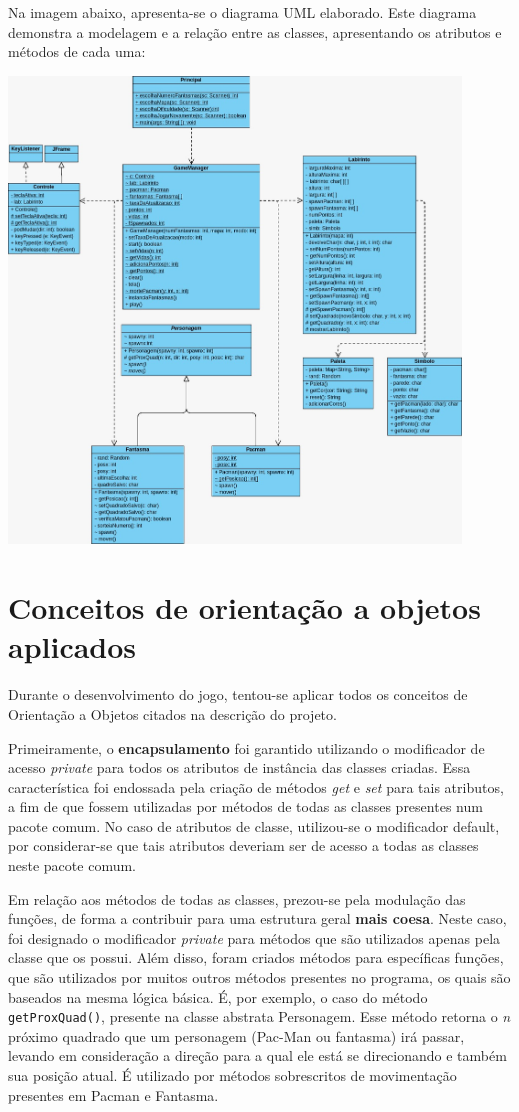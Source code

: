 \documentclass[]{article}
\begin{document}
Na imagem abaixo, apresenta-se o diagrama UML elaborado. Este diagrama demonstra a modelagem e a relação entre as classes, apresentando os atributos e métodos de cada uma:

\begin{center}
\includegraphics[width=12cm]{UML.png}
\end{center}

\section{Conceitos de orientação a objetos aplicados}
Durante o desenvolvimento do jogo, tentou-se aplicar todos os conceitos de Orientação a Objetos citados na descrição do projeto.

Primeiramente, o \textbf{encapsulamento} foi garantido utilizando o modificador de acesso \textsl{private} para todos os atributos de instância das classes criadas. Essa característica foi endossada pela criação de métodos \textsl{get} e \textsl{set} para tais atributos, a fim de que fossem utilizadas por métodos de todas as classes presentes num pacote comum. No caso de atributos de classe, utilizou-se o modificador default, por considerar-se que tais atributos deveriam ser de acesso a todas as classes neste pacote comum.

Em relação aos métodos de todas as classes, prezou-se pela modulação das funções, de forma a contribuir para uma estrutura geral \textbf{mais coesa}. Neste caso, foi designado o modificador \textsl{private} para métodos que são utilizados apenas pela classe que os possui. Além disso, foram criados métodos para específicas funções, que são utilizados por muitos outros métodos presentes no programa, os quais são baseados na mesma lógica básica. É, por exemplo, o caso do método \texttt{getProxQuad()}, presente na classe abstrata Personagem. Esse método retorna o \textsl{n} próximo quadrado que um personagem (Pac-Man ou fantasma) irá passar, levando em consideração a direção para a qual ele está se direcionando e também sua posição atual. É utilizado por métodos sobrescritos de movimentação presentes em Pacman e Fantasma.
\end{document}
